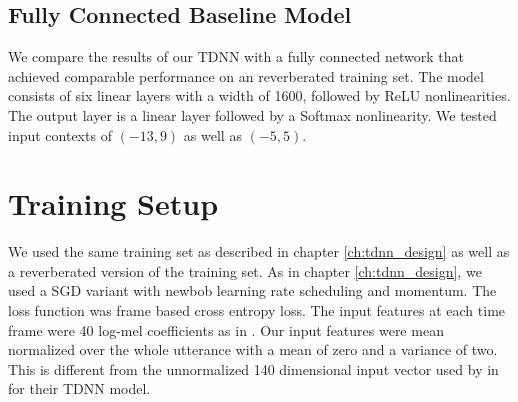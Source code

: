 \begin{minipage}{\linewidth}
	\label{fig:final_tdnn}
	\vspace{5mm}
\end{minipage}
\subsection{Fully Connected Baseline Model}
We compare the results of our TDNN with a fully connected network that achieved comparable performance on an reverberated training set. The model consists of six linear layers with a width of 1600, followed by ReLU nonlinearities. The output layer is a linear layer followed by a Softmax nonlinearity. We tested input contexts of $(-13, 9)$ as well as $(-5, 5)$.
\section{Training Setup}
We used the same training set as described in chapter \ref{ch:tdnn_design} as well as a reverberated version of the training set. As in chapter \ref{ch:tdnn_design}, we used a SGD variant with newbob learning rate scheduling and momentum. The loss function was frame based cross entropy loss. The input features at each time frame were 40 log-mel coefficients as in \cite{nguyen20162016}. Our input features were mean normalized over the whole utterance with a mean of zero and a variance of two. This is different from the unnormalized 140 dimensional input vector used by \cite{peddinti2015reverberation} in \cite{peddinti2015jhu} for their TDNN model.
